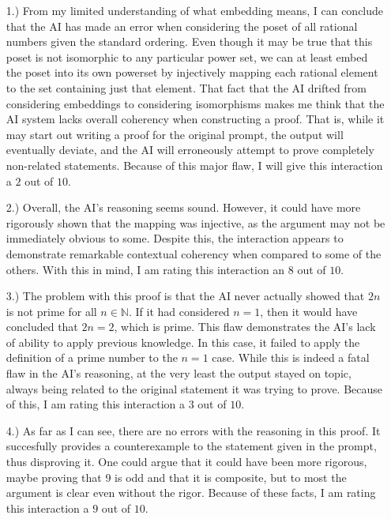 \documentclass[12pt]{article}
\begin{document}
\pagestyle{fancy}
\fancyhead{}

\normalsize

\begin{itemize}
    \item [1.)] From my limited understanding of what embedding means, I can conclude that the AI has made an error when considering the poset of all rational numbers given the standard ordering. Even though it may be true that this poset is not isomorphic to any particular power set, we can at least embed the poset into its own powerset by injectively mapping each rational element to the set containing just that element. That fact that the AI drifted from considering embeddings to considering isomorphisms makes me think that the AI system lacks overall coherency when constructing a proof. That is, while it may start out writing a proof for the original prompt, the output will eventually deviate, and the AI will erroneously attempt to prove completely non-related statements. Because of this major flaw, I will give this interaction a $2$ out of $10$.

    \item [2.)] Overall, the AI's reasoning seems sound. However, it could have more rigorously shown that the mapping was injective, as the argument may not be immediately obvious to some. Despite this, the interaction appears to demonstrate remarkable contextual coherency when compared to some of the others. With this in mind, I am rating this interaction an $8$ out of $10$.

    \item [3.)] The problem with this proof is that the AI never actually showed that $2n$ is not prime for all $n\in\mathbb{N}$. If it had considered $n=1$, then it would have concluded that $2n=2$, which is prime. This flaw demonstrates the AI's lack of ability to apply previous knowledge. In this case, it failed to apply the definition of a prime number to the $n=1$ case. While this is indeed a fatal flaw in the AI's reasoning, at the very least the output stayed on topic, always being related to the original statement it was trying to prove. Because of this, I am rating this interaction a $3$ out of $10$.

    \item [4.)] As far as I can see, there are no errors with the reasoning in this proof. It succesfully provides a counterexample to the statement given in the prompt, thus disproving it. One could argue that it could have been more rigorous, maybe proving that 9 is odd and that it is composite, but to most the argument is clear even without the rigor. Because of these facts, I am rating this interaction a $9$ out of $10$.
\end{itemize}
\end{document}
